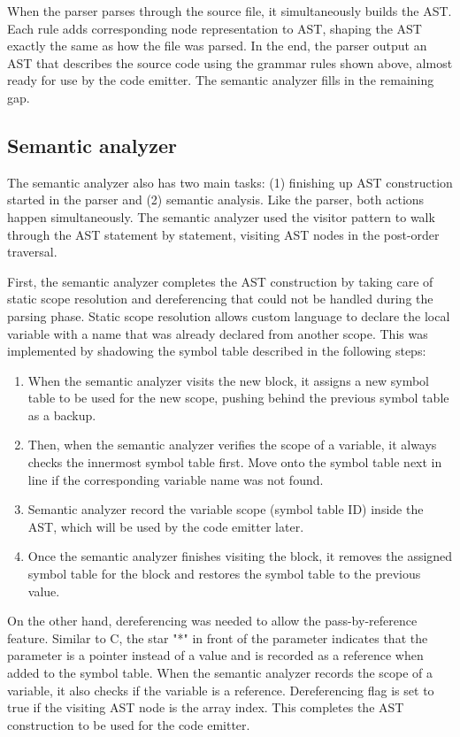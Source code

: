 \documentclass[manuscript,screen,nonacm]{acmart}
\begin{document}
When the parser parses through the source file, it simultaneously builds the AST. Each rule adds corresponding node representation to AST, shaping the AST exactly the same as how the file was parsed. In the end, the parser output an AST that describes the source code using the grammar rules shown above, almost ready for use by the code emitter. The semantic analyzer fills in the remaining gap.


\subsection{Semantic analyzer}
The semantic analyzer also has two main tasks: (1) finishing up AST construction started in the parser and (2) semantic analysis. Like the parser, both actions happen simultaneously. The semantic analyzer used the visitor pattern to walk through the AST statement by statement, visiting AST nodes in the post-order traversal. 

First, the semantic analyzer completes the AST construction by taking care of static scope resolution and dereferencing that could not be handled during the parsing phase. Static scope resolution allows custom language to declare the local variable with a name that was already declared from another scope. This was implemented by shadowing the symbol table described in the following steps:
\begin{enumerate}
    \item When the semantic analyzer visits the new block, it assigns a new symbol table to be used for the new scope, pushing behind the previous symbol table as a backup.
    \item Then, when the semantic analyzer verifies the scope of a variable, it always checks the innermost symbol table first. Move onto the symbol table next in line if the corresponding variable name was not found.
    \item Semantic analyzer record the variable scope (symbol table ID) inside the AST, which will be used by the code emitter later.
    \item Once the semantic analyzer finishes visiting the block, it removes the assigned symbol table for the block and restores the symbol table to the previous value. 
\end{enumerate}

On the other hand, dereferencing was needed to allow the pass-by-reference feature. Similar to C, the star "*" in front of the parameter indicates that the parameter is a pointer instead of a value and is recorded as a reference when added to the symbol table. When the semantic analyzer records the scope of a variable, it also checks if the variable is a reference. Dereferencing flag is set to true if the visiting AST node is the array index. This completes the AST construction to be used for the code emitter.
\end{document}

